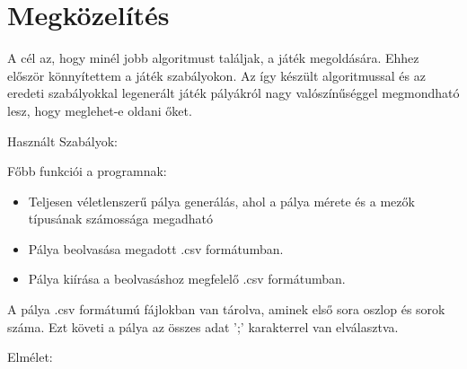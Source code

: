 \documentclass{article}
\begin{document}
	
	\section{Megközelítés}
	
	A cél az, hogy minél jobb algoritmust találjak, a játék megoldására. Ehhez először könnyítettem a játék szabályokon. Az így készült algoritmussal és az eredeti szabályokkal legenerált játék pályákról nagy valószínűséggel megmondható lesz, hogy meglehet-e oldani őket.
	
	
	
	Használt Szabályok:
	
	
	Főbb funkciói a programnak:
	\begin{itemize}
		\item Teljesen véletlenszerű pálya generálás, ahol a pálya mérete és a mezők típusának számossága megadható
		\item Pálya beolvasása megadott .csv formátumban.
		\item Pálya kiírása a beolvasáshoz megfelelő .csv formátumban.		
	\end{itemize}
	
	A pálya .csv formátumú fájlokban van tárolva, aminek első sora oszlop és sorok száma. Ezt követi a pálya az összes adat ';' karakterrel van elválasztva.
	
	
	Elmélet:
	
	
	
	
\end{document}
